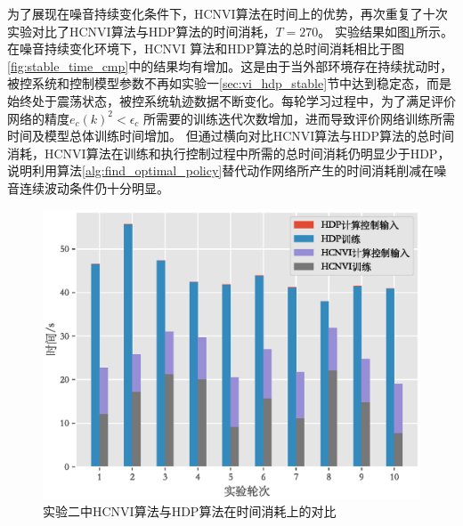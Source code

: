 为了展现在噪音持续变化条件下，HCNVI算法在时间上的优势，再次重复了十次实验对比了HCNVI算法与HDP算法的时间消耗，$T=270$。
实验结果如图\ref{fig:noise_time_cmp}所示。在噪音持续变化环境下，HCNVI
算法和HDP算法的总时间消耗相比于图\ref{fig:stable_time_cmp}中的结果均有增加。这是由于当外部环境存在持续扰动时，被控系统和控制模型参数不再如实验一\ref{sec:vi_hdp_stable}节中达到稳定态，而是始终处于震荡状态，被控系统轨迹数据不断变化。每轮学习过程中，为了满足评价网络的精度$e_{c}(k)^{2}<\epsilon_{c}$
所需要的训练迭代次数增加，进而导致评价网络训练所需时间及模型总体训练时间增加。
但通过横向对比HCNVI算法与HDP算法的总时间消耗，HCNVI算法在训练和执行控制过程中所需的总时间消耗仍明显少于HDP，说明利用算法\ref{alg:find_optimal_policy}替代动作网络所产生的时间消耗削减在噪音连续波动条件仍十分明显。


\begin{figure}[hpbt]
    \centering
    \includegraphics[width=0.8\linewidth]{figures/chapter6/fig13.eps}
    \caption{实验二中HCNVI算法与HDP算法在时间消耗上的对比}
  \addtocounter{figure}{-1}
  \vspace{-5pt}
  \renewcommand{\figurename}{图}

    \label{fig:noise_time_cmp}
\end{figure}
